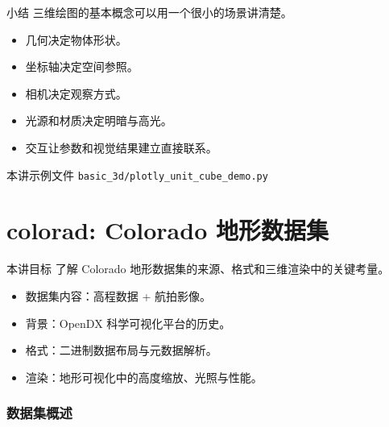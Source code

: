 \documentclass[aspectratio=169,11pt]{ctexbeamer}
\begin{document}
\begin{frame}{小结}
  三维绘图的基本概念可以用一个很小的场景讲清楚。

  \begin{itemize}
    \item 几何决定物体形状。
    \item 坐标轴决定空间参照。
    \item 相机决定观察方式。
    \item 光源和材质决定明暗与高光。
    \item 交互让参数和视觉结果建立直接联系。
  \end{itemize}

  \begin{block}{本讲示例文件}
    \texttt{basic\_3d/plotly\_unit\_cube\_demo.py}
  \end{block}
\end{frame}

\part{colorad: Colorado 地形数据集}

\begin{frame}{本讲目标}
  了解 Colorado 地形数据集的来源、格式和三维渲染中的关键考量。

  \begin{itemize}
    \item 数据集内容：高程数据 + 航拍影像。
    \item 背景：OpenDX 科学可视化平台的历史。
    \item 格式：二进制数据布局与元数据解析。
    \item 渲染：地形可视化中的高度缩放、光照与性能。
  \end{itemize}
\end{frame}

\section{数据集概述}
\end{document}

